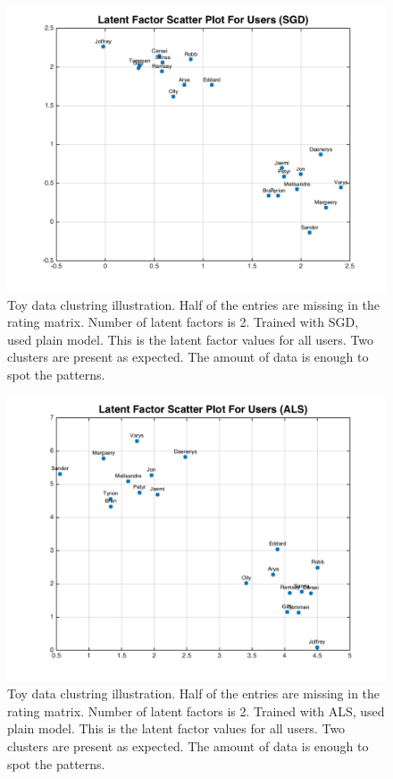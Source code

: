 \documentclass[11pt]{article}
\begin{document}
	\begin{figure}[H]
		\centering		
		\includegraphics[width=\wi]{buff2/3}
		\caption{Toy data clustring illustration. Half of the entries are missing in the rating matrix. Number of latent factors is 2. Trained with SGD, used plain model. This is the latent factor values for all users. Two clusters are present as expected. The amount of data is enough to spot the patterns.}
		\label{5}		
	\end{figure}						
	\begin{figure}[H]
		\centering		
		\includegraphics[width=\wiq]{buff2/4}
		\caption{Toy data clustring illustration. Half of the entries are missing in the rating matrix. Number of latent factors is 2. Trained with ALS, used plain model. This is the latent factor values for all users. Two clusters are present as expected. The amount of data is enough to spot the patterns.}
		\label{5}		
	\end{figure}						
\end{document}
